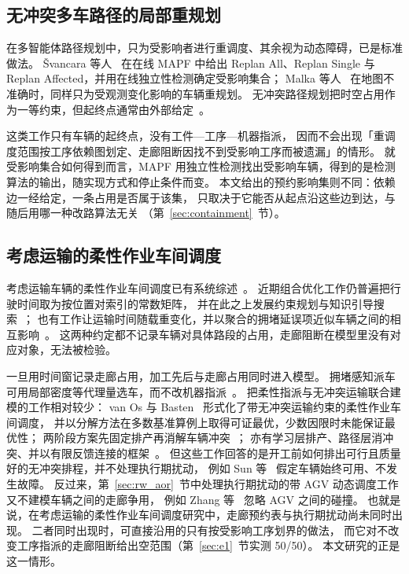 \documentclass[manuscript,screen,review]{acmart}
\newcommand{\NPairs}{50}
\newcommand{\PassMiss}{\NPairs/\NPairs}      %
\begin{document}
\subsection{无冲突多车路径的局部重规划}
\label{sec:rw_mapf}

在多智能体路径规划中，只为受影响者进行重调度、其余视为动态障碍，已是标准做法。
Švancara 等人~\cite{svancara2019online} 在在线 MAPF 中给出
Replan All、Replan Single 与 Replan Affected，并用在线独立性检测确定受影响集合；
Malka 等人~\cite{malka2024online} 在地图不准确时，同样只为受观测变化影响的车辆重规划。
无冲突路径规划把时空占用作为一等约束，但起终点通常由外部给定~\cite{zhang2024guidance}。

这类工作只有车辆的起终点，没有工件—工序—机器指派，
因而不会出现「重调度范围按工序依赖图划定、走廊阻断因找不到受影响工序而被遗漏」的情形。
就受影响集合如何得到而言，MAPF 用独立性检测找出受影响车辆，得到的是检测算法的输出，随实现方式和停止条件而变。
本文给出的预约影响集则不同：依赖边一经给定，一条占用是否属于该集，
只取决于它能否从起点沿这些边到达，与随后用哪一种改路算法无关
（第~\ref{sec:containment}~节）。

\subsection{考虑运输的柔性作业车间调度}
\label{sec:rw_position}

考虑运输车辆的柔性作业车间调度已有系统综述~\cite{xin2025review}。
近期组合优化工作仍普遍把行驶时间取为按位置对索引的常数矩阵，
并在此之上发展约束规划与知识引导搜索~\cite{meng2025cp,qin2026knowledge}；
也有工作让运输时间随载重变化，并以聚合的拥堵延误项近似车辆之间的相互影响~\cite{jafarian2026integrated}。
这两种约定都不记录车辆对具体路段的占用，走廊阻断在模型里没有对应对象，无法被检验。

一旦用时间窗记录走廊占用，加工先后与走廊占用同时进入模型。
拥堵感知派车可用局部密度等代理量选车，而不改机器指派~\cite{kim2026congestion}。
把柔性指派与无冲突运输联合建模的工作相对较少：
van Os 与 Basten~\cite{vanos2026exact} 形式化了带无冲突运输约束的柔性作业车间调度，
并以分解方法在多数基准算例上取得可证最优，少数因限时未能保证最优性；
两阶段方案先固定排产再消解车辆冲突~\cite{sun2023integrated}；
亦有学习层排产、路径层消冲突、并以有限反馈连接的框架~\cite{li2026framework}。
但这些工作回答的是开工前如何排出可行且质量好的无冲突排程，并不处理执行期扰动，
例如 Sun 等~\cite{sun2023integrated} 假定车辆始终可用、不发生故障。
反过来，第~\ref{sec:rw_aor}~节中处理执行期扰动的带 AGV 动态调度工作又不建模车辆之间的走廊争用，
例如 Zhang 等~\cite{zhang2023energy} 忽略 AGV 之间的碰撞。
也就是说，在考虑运输的柔性作业车间调度研究中，走廊预约表与执行期扰动尚未同时出现。
二者同时出现时，可直接沿用的只有按受影响工序划界的做法，
而它对不改变工序指派的走廊阻断给出空范围（第~\ref{sec:e1}~节实测 \PassMiss）。
本文研究的正是这一情形。
\end{document}
